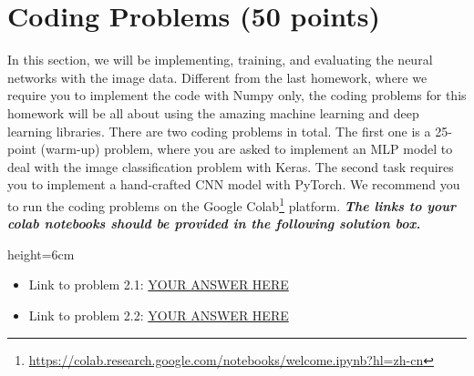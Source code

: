\section{Coding Problems (50 points)}
\begin{notebox}
In this section, we will be implementing, training, and evaluating the neural networks with the image data. Different from the last homework, where we require you to implement the code with Numpy only, the coding problems for this homework will be all about using the amazing machine learning and deep learning libraries. There are two coding problems in total. The first one is a 25-point (warm-up) problem, where you are asked to implement an MLP model to deal with the image classification problem with Keras. The second task requires you to implement a hand-crafted CNN model with PyTorch. We recommend you to run the coding problems on the Google Colab\footnote{\url{https://colab.research.google.com/notebooks/welcome.ipynb?hl=zh-cn}} platform. \textit{\textbf{The links to your colab notebooks should be provided in the following solution box.}}
\end{notebox}

\begin{soln}{height=6cm}
\begin{itemize}
    \item Link to problem 2.1: \url{YOUR ANSWER HERE}
    \item Link to problem 2.2: \url{YOUR ANSWER HERE}    
\end{itemize}
\end{soln}

\clearpage
